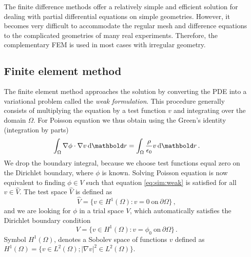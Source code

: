 The finite difference methods offer a relatively simple and efficient solution
for dealing with partial differential equations on simple geometries.
However, it becomes very difficult to accommodate the regular mesh
and difference equations to
the complicated geometries of many real experiments.
Therefore, the complementary \ac{FEM} is used in
most cases with irregular geometry.

\subsection{Finite element method}
The finite element method approaches the solution by converting the
\ac{PDE} into a variational problem called the {\em weak formulation}.
This procedure generally consists of multiplying the equation by a test function
$v$ and integrating over the domain $\Omega$. For Poisson equation we thus obtain using the
Green's identity (integration by parts)
\begin{equation}
\int_\Omega \nabla\phi\cdot\nabla v\de\mb r = \int_\Omega\frac{\rho}{\epsilon_0}v\de\mb r\,.
\label{eq:sim:weak}
\end{equation}
We drop the boundary integral, because we choose test functions equal zero on the Dirichlet boundary,
where $\phi$ is known. Solving Poisson equation is now equivalent to finding $\phi\in V$ such
that equation \eqref{eq:sim:weak} is satisfied for all $v\in \hat V$.
The test space $\hat V$ is defined as
\begin{equation}
\hat V = \{v\in H^1(\Omega) : v=0\ \text{on}\ \partial\Omega\}\,,
\end{equation}
and we are looking for $\phi$ in a trial space $V$, which automatically satisfies the Dirichlet
boundary condition
\begin{equation}
V = \{v\in H^1(\Omega) : v=\phi_0\ \text{on}\ \partial\Omega\}\,.
\end{equation}
Symbol $H^1(\Omega)$, denotes a Sobolev space of functions $v$ defined as $H^1(\Omega) = \{v\in L^2(\Omega); |\nabla v|^2 \in L^2(\Omega)\}$.

